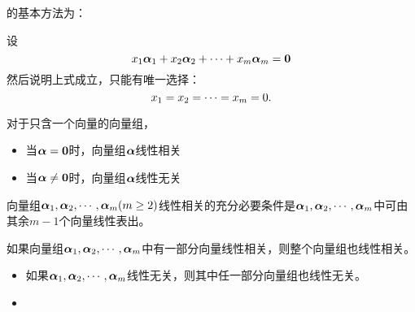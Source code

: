 \begin{frame}
  的基本方法为：

  设
  $$
  x_1\boldsymbol{\alpha}_1+x_2\boldsymbol{\alpha}_2+\cdots+x_m\boldsymbol{\alpha}_m=\boldsymbol{0}
  $$
  然后说明上式成立，只能有唯一选择：
  $$
  x_1=x_2=\cdots=x_m=0.
  $$
\end{frame}


\begin{frame}
  对于只含一个向量的向量组，
  \begin{itemize}
  \item 当$\boldsymbol{\alpha}=\boldsymbol{0}$时，向量组$\boldsymbol{\alpha}$线性相关
  \item 当$\boldsymbol{\alpha}\ne \boldsymbol{0}$时，向量组$\boldsymbol{\alpha}$线性无关
  \end{itemize}
\end{frame}




\begin{frame}
  \begin{dingli}
    向量组$\boldsymbol{\alpha}_1,\boldsymbol{\alpha}_2,\cdots,\boldsymbol{\alpha}_m(m\ge 2)$线性相关的充分必要条件是$\boldsymbol{\alpha}_1,\boldsymbol{\alpha}_2,\cdots,\boldsymbol{\alpha}_m$中可由其余$m-1$个向量线性表出。
  \end{dingli}

\end{frame}




\begin{frame}
  \begin{jielun}
    如果向量组$\boldsymbol{\alpha}_1,\boldsymbol{\alpha}_2,\cdots,\boldsymbol{\alpha}_m$中有一部分向量线性相关，则整个向量组也线性相关。
  \end{jielun}

  \begin{zhu*}
    \begin{itemize}
    \item 如果$\boldsymbol{\alpha}_1,\boldsymbol{\alpha}_2,\cdots,\boldsymbol{\alpha}_m$线性无关，则其中任一部分向量组也线性无关。              
    \item     {}
    \end{itemize}
    
  \end{zhu*}


\end{frame}


